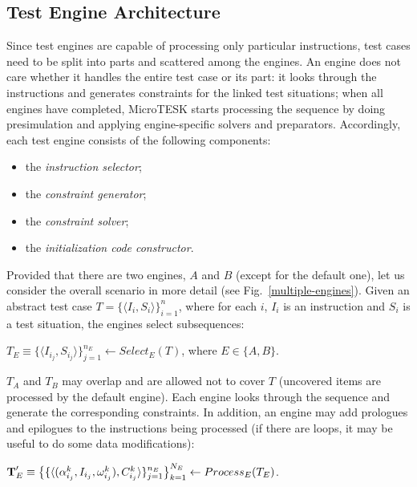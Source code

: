 \subsection{Test Engine Architecture}

Since test engines are capable of processing only particular instructions, test cases need to be split into parts and scattered among the engines.
An engine does not care whether it handles the entire test case or its part:
it looks through the instructions and generates constraints for the linked test situations;
when all engines have completed, MicroTESK starts processing the sequence by doing presimulation and applying engine-specific solvers and preparators.
Accordingly, each test engine consists of the following components:

\begin{itemize}
\item
the \emph{instruction selector};
\item
the \emph{constraint generator};
\item
the \emph{constraint solver};
\item
the \emph{initialization code constructor}.
\end{itemize}

Provided that there are two engines, $A$ and $B$ (except for the default one), let us consider the overall scenario in more detail (see Fig.~\ref{multiple-engines}).
Given an abstract test case $T = \{\langle I_i, S_i \rangle\}_{i=1}^n$,
where for each $i$, $I_i$ is an instruction and $S_i$ is a test situation,
the engines select subsequences:

\vspace{2mm}
$T_E \equiv \{\langle I_{i_j}, S_{i_j} \rangle\}_{j=1}^{n_E} \leftarrow Select_E(T)$, where $E \in \{A, B\}$.
\vspace{2mm}

$T_A$ and $T_B$ may overlap and are allowed not to cover $T$ (uncovered items are processed by the default engine).
Each engine looks through the sequence and generate the corresponding constraints.
In addition, an engine may add prologues and epilogues to the instructions being processed
(if there are loops, it may be useful to do some data modifications):

\vspace{2mm}
$\textbf{T}'_E \equiv \big{\{}\{\langle (\alpha_{i_j}^k, I_{i_j}, \omega_{i_j}^k), C_{i_j}^k \rangle\}_{j=1}^{n_E}\big{\}}_{k=1}^{N_E} \leftarrow Process_E(T_E)$.
\vspace{2mm}

